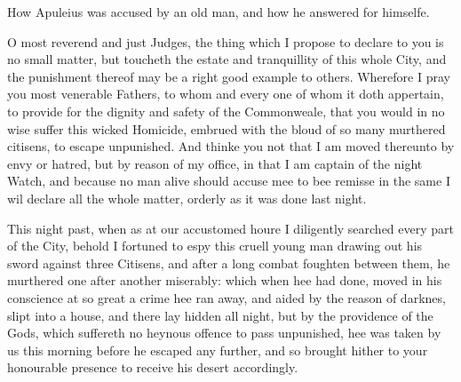 How Apuleius was accused by an old man, and how he answered for himselfe.

O most reverend and just Judges, the thing which I propose to declare to you is
no small matter, but toucheth the estate and tranquillity of this whole City,
and the punishment thereof may be a right good example to others. Wherefore I
pray you most venerable Fathers, to whom and every one of whom it doth
appertain, to provide for the dignity and safety of the Commonweale, that you
would in no wise suffer this wicked Homicide, embrued with the bloud of so many
murthered citisens, to escape unpunished. And thinke you not that I am moved
thereunto by envy or hatred, but by reason of my office, in that I am captain
of the night Watch, and because no man alive should accuse mee to bee remisse
in the same I wil declare all the whole matter, orderly as it was done last
night.

This night past, when as at our accustomed houre I diligently searched every
part of the City, behold I fortuned to espy this cruell young man drawing out
his sword against three Citisens, and after a long combat foughten between
them, he murthered one after another miserably: which when hee had done, moved
in his conscience at so great a crime hee ran away, and aided by the reason of
darknes, slipt into a house, and there lay hidden all night, but by the
providence of the Gods, which suffereth no heynous offence to pass unpunished,
hee was taken by us this morning before he escaped any further, and so brought
hither to your honourable presence to receive his desert accordingly.

